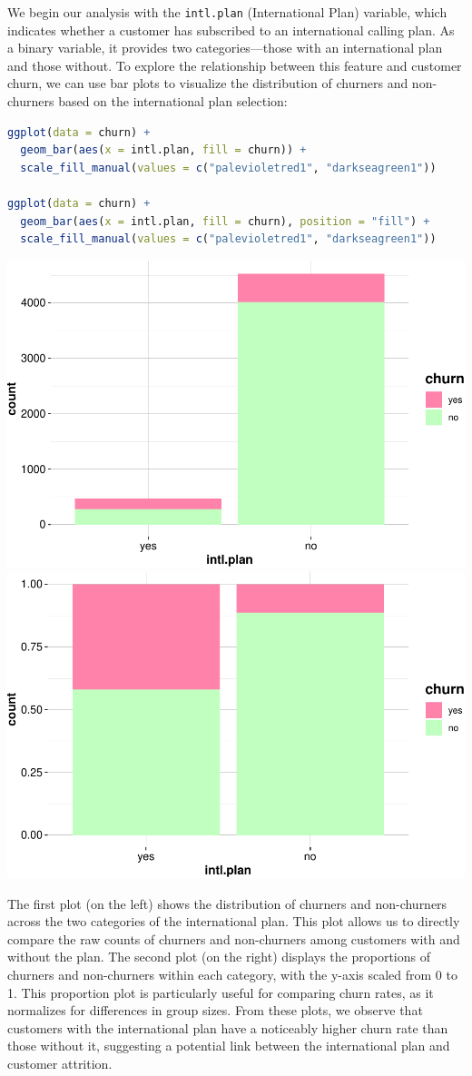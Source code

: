 \documentclass[
]{book}
\newcommand{\passthrough}[1]{#1}
\theoremstyle{definition}
\theoremstyle{definition}
\theoremstyle{definition}
\theoremstyle{definition}
\theoremstyle{remark}
\begin{document}
We begin our analysis with the \passthrough{\lstinline!intl.plan!} (International Plan) variable, which indicates whether a customer has subscribed to an international calling plan. As a binary variable, it provides two categories---those with an international plan and those without. To explore the relationship between this feature and customer churn, we can use bar plots to visualize the distribution of churners and non-churners based on the international plan selection:

\begin{lstlisting}[language=R]
ggplot(data = churn) + 
  geom_bar(aes(x = intl.plan, fill = churn)) +
  scale_fill_manual(values = c("palevioletred1", "darkseagreen1")) 

ggplot(data = churn) + 
  geom_bar(aes(x = intl.plan, fill = churn), position = "fill") +
  scale_fill_manual(values = c("palevioletred1", "darkseagreen1")) 
\end{lstlisting}

\includegraphics[width=0.5\linewidth]{EDA_files/figure-latex/unnamed-chunk-6-1} \includegraphics[width=0.5\linewidth]{EDA_files/figure-latex/unnamed-chunk-6-2}

The first plot (on the left) shows the distribution of churners and non-churners across the two categories of the international plan. This plot allows us to directly compare the raw counts of churners and non-churners among customers with and without the plan. The second plot (on the right) displays the proportions of churners and non-churners within each category, with the y-axis scaled from 0 to 1. This proportion plot is particularly useful for comparing churn rates, as it normalizes for differences in group sizes. From these plots, we observe that customers with the international plan have a noticeably higher churn rate than those without it, suggesting a potential link between the international plan and customer attrition.
\end{document}
